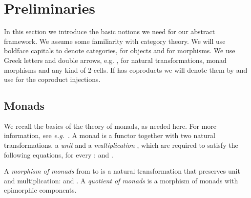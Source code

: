 \documentclass[oribibl,envcountsame,envcountsect,runningheads]{llncs}
\renewcommand{\>}{\rangle}
\begin{document}
\section{Preliminaries}\label{Sec:Trace}
In this section we introduce the basic notions we need for our abstract framework. We assume some familiarity with
category theory. We will use boldface capitals  to denote categories,  for objects and  for morphisms.
We use Greek letters and double arrows, e.g. , for natural transformations, monad morphisms and any kind of 2-cells. If  has coproducts we will denote them by  and use  for the coproduct injections.


\subsection{Monads}

We recall the basics of the theory of monads, as needed here. For more information, see \textit{e.g.}~\cite{MacLane71}. A monad is a functor  together with two natural transformations, a \emph{unit}  and a \emph{multiplication} , which are required to satisfy the following equations, for every :  and .

A \emph{morphism of monads} from  to  is a natural transformation  that preserves unit and multiplication:  and . A \emph{quotient of monads} is a morphism of monads with epimorphic components.
\end{document}
